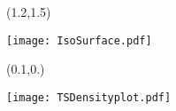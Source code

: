 \documentclass{beamer}
\begin{document}
 
\begin{frame}[plain,t]{}
%		
%   
	\centering
	\begin{textblock}{10}(1.2,1.5)
			\begin{minipage}{\textwidth}
			\texttt{[image: IsoSurface.pdf]}
			\end{minipage}
	\end{textblock}%
	

	\begin{textblock}{5.5}(0.1,0.)
			\begin{minipage}{\textwidth}
			\texttt{[image: TSDensityplot.pdf]}
			\end{minipage}
	\end{textblock}%
	

\end{frame}
	
\end{document}
